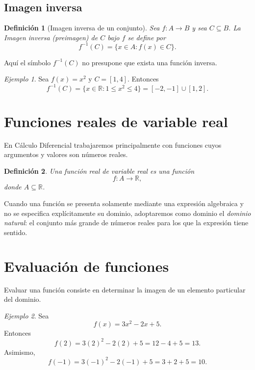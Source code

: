 \documentclass[12pt]{article}
\newtheorem{definicion}{Definición}[section]
\theoremstyle{remark}
\newtheorem{ejemplo}{Ejemplo}[section]
\newcommand{\R}{\mathbb{R}}
\begin{document}
\subsection{Imagen inversa}
\begin{definicion}[Imagen inversa de un conjunto]
Sea $f:A\to B$ y sea $C\subseteq B$. La Imagen inversa (preimagen) de $C$ bajo $f$ se define por
\[
f^{-1}(C)=\{x\in A:f(x)\in C\}.
\]
\end{definicion}

Aquí el símbolo $f^{-1}(C)$ no presupone que exista una función inversa.

\begin{ejemplo}
Sea $f(x)=x^2$ y $C=[1,4]$. Entonces
\[
f^{-1}(C)=\{x\in\R:1\leq x^2\leq4\}
=[-2,-1]\cup[1,2].
\]
\end{ejemplo}

\section{Funciones reales de variable real}

En Cálculo Diferencial trabajaremos principalmente con funciones cuyos
argumentos y valores son números reales.

\begin{definicion}
Una función real de variable real es una función
\[
f:A\to\R,
\]
donde $A\subseteq\R$.
\end{definicion}

Cuando una función se presenta solamente mediante una expresión algebraica y
no se especifica explícitamente su dominio, adoptaremos como dominio el
\emph{dominio natural}: el conjunto más grande de números reales para los que
la expresión tiene sentido.

\section{Evaluación de funciones}

Evaluar una función consiste en determinar la imagen de un elemento particular
del dominio.

\begin{ejemplo}
Sea
\[
f(x)=3x^2-2x+5.
\]
Entonces
\[
f(2)=3(2)^2-2(2)+5=12-4+5=13.
\]
Asimismo,
\[
f(-1)=3(-1)^2-2(-1)+5=3+2+5=10.
\]
\end{ejemplo}
\end{document}
